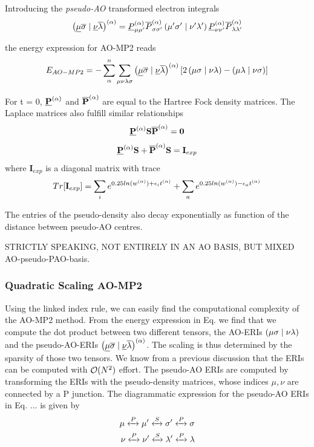 \noindent Introducing the \emph{pseudo-AO} transformed electron integrals
\begin{equation}
\left( \underline{\mu}\overline{\sigma} \mid \underline{\nu}\overline{\lambda} \right)^{(\alpha)} = \underline{P}^{(\alpha)}_{\mu\mu'} \overline{P}^{(\alpha)}_{\sigma\sigma'} \left( \mu'\sigma' \mid \nu'\lambda' \right) \underline{P}^{(\alpha)}_{\nu\nu'} \overline{P}^{(\alpha)}_{\lambda\lambda'}
\end{equation}

\noindent the energy expression for AO-MP2 reads
\begin{equation}
E_{AO-MP2} = - \sum_{\alpha}^n \sum_{\mu\nu\lambda\sigma} \left( \underline{\mu}\overline{\sigma} \mid \underline{\nu}\overline{\lambda} \right)^{(\alpha)} \left [ 2\left( \mu\sigma \mid \nu\lambda \right) -  \left( \mu\lambda \mid \nu\sigma \right) \right]
\end{equation}

\noindent For t = 0, $\underline{\mathbf{P}}^{(\alpha)}$ and $\overline{\mathbf{P}}^{(\alpha)}$ are equal to the Hartree Fock density matrices. The Laplace matrices also fulfill similar relationships
\begin{equation}
\underline{\mathbf{P}}^{(\alpha)} \mathbf{S} \overline{\mathbf{P}}^{(\alpha)} = \mathbf{0}
\end{equation}
\begin{equation}
\underline{\mathbf{P}}^{(\alpha)} \mathbf{S} + \overline{\mathbf{P}}^{(\alpha)} \mathbf{S} = \mathbf{I}_{exp}
\end{equation}
\noindent where $\mathbf{I}_{exp}$ is a diagonal matrix with trace
\begin{equation}
Tr[\mathbf{I}_{exp}] = \sum_i e^{0.25 ln(w^{(\alpha)}) + \epsilon_i t^{(\alpha)}} + \sum_a e^{0.25 ln(w^{(\alpha)}) - \epsilon_a t^{(\alpha)}}
\end{equation}

The entries of the pseudo-density also decay exponentially as function of the distance between pseudo-AO centres. 

STRICTLY SPEAKING, NOT ENTIRELY IN AN AO BASIS, BUT MIXED AO-pseudo-PAO-basis.

\subsubsection{Quadratic Scaling AO-MP2}

Using the linked index rule, we can easily find the computational complexity of the AO-MP2 method. From the energy expression in Eq. we find that we compute the dot product between two different tensors, the AO-ERIs $\left( \mu\sigma \mid \nu\lambda \right)$ and the pseudo-AO-ERIs $\left( \underline{\mu}\overline{\sigma} \mid \underline{\nu}\overline{\lambda} \right)^{(\alpha)}$. The scaling is thus determined by the sparsity of those two tensors. We know from a previous discussion that the ERIs can be computed with $\mathcal{O}(N^{2})$ effort. The pseudo-AO ERIs are computed by transforming the ERIs with the pseudo-density matrices, whose indices $\mu,\nu$ are connected by a P junction. The diagrammatic expression for the pseudo-AO ERIs in Eq. ... is given by
\begin{equation}
\begin{split}
\mu \xleftrightarrow{P} \mu' \xleftrightarrow{S} \sigma' \xleftrightarrow{P} \sigma \\
\nu \xleftrightarrow{P} \nu' \xleftrightarrow{S} \lambda' \xleftrightarrow{P} \lambda
\end{split}
\end{equation}

